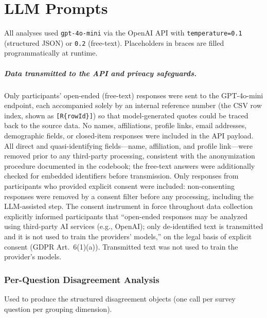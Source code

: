 
\chapter{LLM Prompts}
\label{ch:prompts}

All analyses used \texttt{gpt-4o-mini} via the OpenAI API with  \texttt{temperature=0.1} (structured JSON) or \texttt{0.2} (free-text).
Placeholders in braces are filled programmatically at runtime.

\paragraph{Data transmitted to the API and privacy safeguards.}
Only participants' open-ended (free-text) responses were sent to the
GPT-4o-mini endpoint, each accompanied solely by an internal reference
number (the CSV row index, shown as \texttt{[R\{rowId\}]}) so that
model-generated quotes could be traced back to the source data. No names,
affiliations, profile links, email addresses, demographic fields, or
closed-item responses were included in the API payload. All direct and
quasi-identifying fields---name, affiliation, and profile link---were
removed prior to any third-party processing, consistent with the
anonymization procedure documented in the codebook; the free-text
answers were additionally checked for embedded identifiers before
transmission. Only responses from participants who provided explicit
consent were included: non-consenting responses were removed by a consent
filter before any processing, including the LLM-assisted step. The consent
instrument in force throughout data collection explicitly informed
participants that ``open-ended responses may be analyzed using third-party
AI services (e.g., OpenAI); only de-identified text is transmitted and it
is not used to train the providers' models,'' on the legal basis of
explicit consent (GDPR Art.~6(1)(a)). Transmitted text was not used to
train the provider's models.

\subsection{Per-Question Disagreement Analysis}
\label{app:prompt-per-question}

Used to produce the structured disagreement objects (one call per survey question per grouping dimension).


